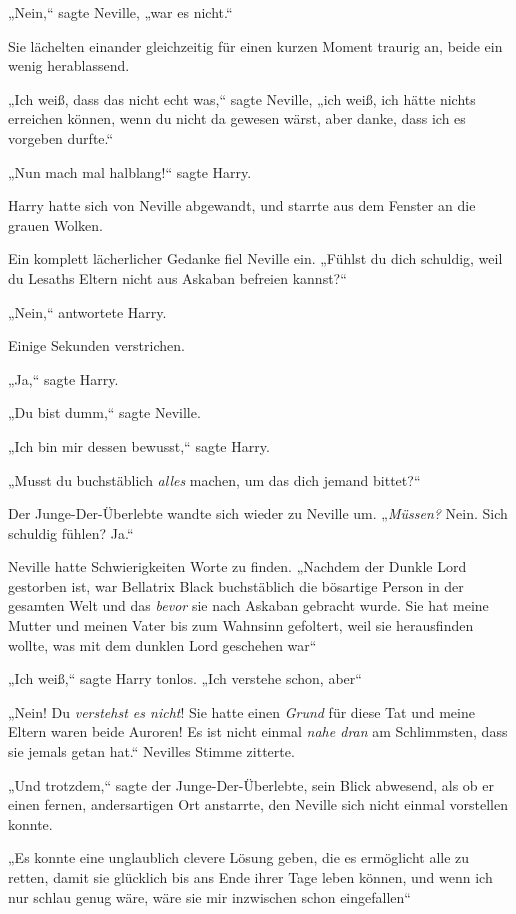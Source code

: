 {„Nein,“ sagte Neville, „war es nicht.“

Sie lächelten einander gleichzeitig für einen kurzen Moment traurig an, beide ein wenig herablassend.

„Ich weiß, dass das nicht echt was,“ sagte Neville, „ich weiß, ich hätte nichts erreichen können, wenn du nicht da gewesen wärst, aber danke, dass ich es vorgeben durfte.“

„Nun mach mal halblang!“ sagte Harry.

Harry hatte sich von Neville abgewandt, und starrte aus dem Fenster an die grauen Wolken.

Ein komplett lächerlicher Gedanke fiel Neville ein. „Fühlst du dich schuldig, weil du Lesaths Eltern nicht aus Askaban befreien kannst?“

„Nein,“ antwortete Harry.

Einige Sekunden verstrichen.

„Ja,“ sagte Harry.

„Du bist dumm,“ sagte Neville.

„Ich bin mir dessen bewusst,“ sagte Harry.

„Musst du buchstäblich \emph{alles} machen, um das dich jemand bittet?“

Der Junge-Der-Überlebte wandte sich wieder zu Neville um. „\emph{Müssen?} Nein. Sich schuldig fühlen? Ja.“

Neville hatte Schwierigkeiten Worte zu finden. „Nachdem der Dunkle Lord gestorben ist, war Bellatrix Black buchstäblich die bösartige Person in der gesamten Welt und das \emph{bevor} sie nach Askaban gebracht wurde. Sie hat meine Mutter und meinen Vater bis zum Wahnsinn gefoltert, weil sie herausfinden wollte, was mit dem dunklen Lord geschehen war\later“

„Ich weiß,“ sagte Harry tonlos. „Ich verstehe schon, aber\later“

„Nein! Du \emph{verstehst es nicht}! Sie hatte einen \emph{Grund} für diese Tat und meine Eltern waren beide Auroren! Es ist nicht einmal \emph{nahe dran} am Schlimmsten, dass sie jemals getan hat.“ Nevilles Stimme zitterte.

„Und trotzdem,“ sagte der Junge-Der-Überlebte, sein Blick abwesend, als ob er einen fernen, andersartigen Ort anstarrte, den Neville sich nicht einmal vorstellen konnte.

„Es konnte eine unglaublich clevere Lösung geben, die es ermöglicht alle zu retten, damit sie glücklich bis ans Ende ihrer Tage leben können, und wenn ich nur schlau genug wäre, wäre sie mir inzwischen schon eingefallen\later“

}
